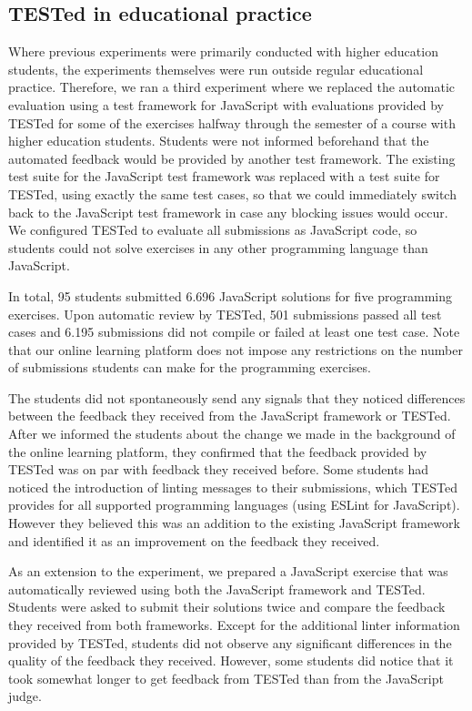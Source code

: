 \documentclass[../main]{subfiles}
\begin{document}
\subsection{TESTed in educational practice}\label{subsec:tested-in-educational-practice}

Where previous experiments were primarily conducted with higher education students, the experiments themselves were run outside regular educational practice.
Therefore, we ran a third experiment where we replaced the automatic evaluation using a test framework for JavaScript with evaluations provided by TESTed for some of the exercises halfway through the semester of a course with higher education students.
Students were not informed beforehand that the automated feedback would be provided by another test framework.
The existing test suite for the JavaScript test framework was replaced with a test suite for TESTed, using exactly the same test cases, so that we could immediately switch back to the JavaScript test framework in case any blocking issues would occur.
We configured TESTed to evaluate all submissions as JavaScript code, so students could not solve exercises in any other programming language than JavaScript.

In total, 95 students submitted 6.696 JavaScript solutions for five programming exercises.
Upon automatic review by TESTed, 501 submissions passed all test cases and 6.195 submissions did not compile or failed at least one test case.
Note that our online learning platform does not impose any restrictions on the number of submissions students can make for the programming exercises.

The students did not spontaneously send any signals that they noticed differences between the feedback they received from the JavaScript framework or TESTed.
After we informed the students about the change we made in the background of the online learning platform, they confirmed that the feedback provided by TESTed was on par with feedback they received before.
Some students had noticed the introduction of linting messages to their submissions, which TESTed provides for all supported programming languages (using ESLint for JavaScript).
However they believed this was an addition to the existing JavaScript framework and identified it as an improvement on the feedback they received.

As an extension to the experiment, we prepared a JavaScript exercise that was automatically reviewed using both the JavaScript framework and TESTed.
Students were asked to submit their solutions twice and compare the feedback they received from both frameworks.
Except for the additional linter information provided by TESTed, students did not observe any significant differences in the quality of the feedback they received.
However, some students did notice that it took somewhat longer to get feedback from TESTed than from the JavaScript judge.
\end{document}
